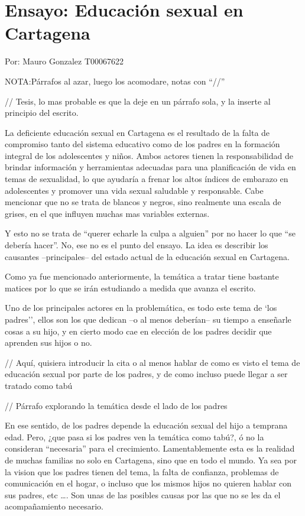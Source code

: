 \documentclass[letterpaper, 12pt]{report}
\begin{document}
\chapter*{Ensayo: Educación sexual en Cartagena}

\noindent\makebox[\linewidth]{\rule{\textwidth}{0.4pt}}

Por: Mauro Gonzalez T00067622

\noindent\makebox[\linewidth]{\rule{\textwidth}{0.4pt}}

NOTA:\@ Párrafos al azar, luego los acomodare, notas con
``//''

\bigskip

{\small // Tesis, lo mas probable es que la deje en un párrafo sola, y la inserte
    al principio del escrito.}

La deficiente educación sexual en Cartagena es el resultado
de la falta de compromiso tanto del sistema educativo como
de los padres en la formación integral de los adolescentes
y niños. Ambos actores tienen la responsabilidad de brindar
información y herramientas adecuadas para una planificación
de vida en temas de sexualidad, lo que ayudaría a frenar
los altos índices de embarazo en adolescentes y promover
una vida sexual saludable y responsable. Cabe mencionar que
no se trata de blancos y negros, sino realmente una escala
de grises, en el que influyen muchas mas variables
externas.

Y esto no se trata de ``querer echarle la culpa a alguien''
por no hacer lo que ``se debería hacer''. No, ese no es el
punto del ensayo. La idea es describir los causantes
--principales-- del estado actual de la educación sexual en
Cartagena.

Como ya fue mencionado anteriormente, la temática a tratar
tiene bastante matices por lo que se irán estudiando a
medida que avanza el escrito.

Uno de los principales actores en la problemática, es todo
este tema de `los padres'', ellos son los que dedican --o
al menos deberían-- su tiempo a enseñarle cosas a su hijo,
y en cierto modo cae en elección de los padres decidir que
aprenden sus hijos o no.

    {\small // Aquí, quisiera introducir la cita o al menos hablar de como es visto
        el tema de educación sexual por parte de los padres, y de como incluso puede
        llegar a ser tratado como tabú}

    {\small // Párrafo explorando la temática desde el lado de los padres}

En ese sentido, de los padres depende la educación sexual
del hijo a temprana edad. Pero, ¿que pasa si los padres ven
la temática como tabú?, ó no la consideran ``necesaria''
para el crecimiento. Lamentablemente esta es la realidad de
muchas familias no solo en Cartagena, sino que en todo el
mundo. Ya sea por la vision que los padres tienen del tema,
la falta de confianza, problemas de comunicación en el
hogar, o incluso que los mismos hijos no quieren hablar con
sus padres, etc \dots. Son unas de las posibles causas por
las que no se les da el acompañamiento necesario.
\end{document}
